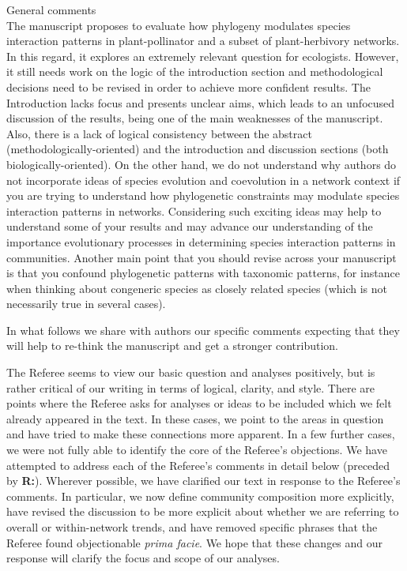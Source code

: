 \documentclass[12pt]{letter}
\newenvironment{refquote}{\bigskip \begin{it}}{\end{it}\smallskip}
\begin{document}
	\begin{refquote}
	General comments\\

	The manuscript proposes to evaluate how phylogeny modulates species interaction patterns in plant-pollinator and a subset of plant-herbivory networks. In this regard, it explores an extremely relevant question for ecologists. However, it still needs work on the logic of the introduction section and methodological decisions need to be revised in order to achieve more confident results. The Introduction lacks focus and presents unclear aims, which leads to an unfocused discussion of the results, being one of the main weaknesses of the manuscript. Also, there is a lack of logical consistency between the abstract (methodologically-oriented) and the introduction and discussion sections (both biologically-oriented). On the other hand, we do not understand why authors do not incorporate ideas of species evolution and coevolution in a network context if you are trying to understand how phylogenetic constraints may modulate species interaction patterns in networks. Considering such exciting ideas may help to understand some of your results and may advance our understanding of  the importance evolutionary processes in determining species interaction patterns in communities.
	Another main point that you should revise across your manuscript is that you confound phylogenetic patterns with taxonomic patterns, for instance when thinking about congeneric species as closely related species (which is not necessarily true in several cases).

	\smallskip

	In what follows we share with authors our specific comments expecting that they will help to re-think the manuscript and get a stronger contribution.

	\end{refquote}


	The Referee seems to view our basic question and analyses positively, but is rather critical of our writing in terms of logical, clarity, and style.
	There are points where the Referee asks for analyses or ideas to be included which we felt already appeared in the text.
	In these cases, we point to the areas in question and have tried to make these connections more apparent.
	In a few further cases, we were not fully able to identify the core of the Referee's objections. We have attempted to address each of the Referee's comments in detail below (preceded by \textbf{R:}). Wherever possible, we have clarified our text in response to the Referee's comments. In particular, we now define community composition more explicitly, have revised the discussion to be more explicit about whether we are referring to overall or within-network trends, and have removed specific phrases that the Referee found objectionable \emph{prima facie}. We hope that these changes and our response will clarify the focus and scope of our analyses.
\end{document}
